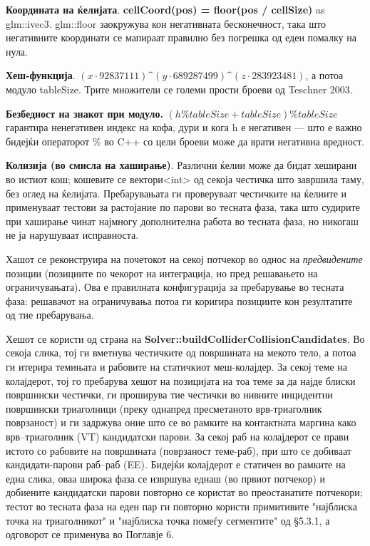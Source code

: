 \textbf{Координата на ќелијата}. \textbf{cellCoord(pos) = floor(pos / cellSize)} as glm::ivec3. glm::floor заокружува кон негативната бесконечност, така што негативните координати се мапираат правилно без погрешка од еден помалку на нула.

\textbf{Хеш-функција}. $(x · 92837111) \^ (y · 689287499) \^ (z · 283923481)$, а потоа модуло tableSize. Трите множители се големи прости броеви од Teschner 2003.

\textbf{Безбедност на знакот при модуло.} $(h \% tableSize + tableSize) \% tableSize$ гарантира ненегативен индекс на кофа, дури и кога h е негативен — што е важно бидејќи операторот \% во C++ со цели броеви може да врати негативна вредност.

\textbf{Колизија (во смисла на хаширање)}. Различни ќелии може да бидат хеширани во истиот кош; кошевите се вектори<int> од секоја честичка што завршила таму, без оглед на ќелијата. Пребарувањата ги проверуваат честичките на ќелиите и применуваат тестови за растојание по парови во тесната фаза, така што судирите при хаширање чинат најмногу дополнителна работа во тесната фаза, но никогаш не ја нарушуваат исправноста.

Хашот се реконструира на почетокот на секој потчекор во однос на \textit{предвидените} позиции (позициите по чекорот на интеграција, но пред решавањето на ограничувањата). Ова е правилната конфигурација за пребарување во тесната фаза: решавачот на ограничувања потоа ги коригира позициите кон резултатите од тие пребарувања.

Хешот се користи од страна на \textbf{Solver::buildColliderCollisionCandidates}. Во секоја слика, тој ги вметнува честичките од површината на мекото тело, а потоа ги итерира темињата и рабовите на статичкиот меш-колајдер. За секој теме на колајдерот, тој го пребарува хешот на позицијата на тоа теме за да најде блиски површински честички, ги проширува тие честички во нивните инцидентни површински триаголници (преку однапред пресметаното врв-триаголник поврзаност) и ги задржува оние што се во рамките на контактната маргина како врв–триаголник (VT) кандидатски парови. За секој раб на колајдерот се прави истото со рабовите на површината (поврзаност теме-раб), при што се добиваат кандидати-парови раб–раб (EE). Бидејќи колајдерот е статичен во рамките на една слика, оваа широка фаза се извршува еднаш (во првиот потчекор) и добиените кандидатски парови повторно се користат во преостанатите потчекори; тестот во тесната фаза на еден пар ги повторно користи примитивите "најблиска точка на триаголникот" и "најблиска точка помеѓу сегментите" од §5.3.1, а одговорот се применува во Поглавје 6.

